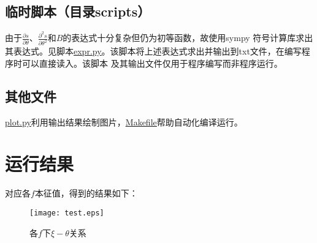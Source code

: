 \documentclass{ctexart}
\def\file#1#2{\href{#1/#2}{\underline{#2}}}
\begin{document}
    \subsection{临时脚本（目录scripts）}
        由于$\frac{\partial s}{\partial\theta}$、$\frac{\partial^2s}{\partial\theta^2}$和$B$的表达式十分复杂但仍为初等函数，故使用sympy
        符号计算库求出其表达式。见脚本\file{scripts}{expr.py}。该脚本将上述表达式求出并输出到txt文件，在编写程序时可以直接读入。该脚本
        及其输出文件仅用于程序编写而非程序运行。
    \subsection{其他文件}
        \file{.}{plot.py}利用输出结果绘制图片，\href{./Makefile}{\underline{Makefile}}帮助自动化编译运行。

\section{运行结果}
    对应各$f$本征值，得到的结果如下：\\
    \begin{figure}[hb]
        \centering
        \texttt{[image: test.eps]}
        \caption{\small 各$f$下$\xi-\theta$关系}
    \end{figure}
\end{document}
